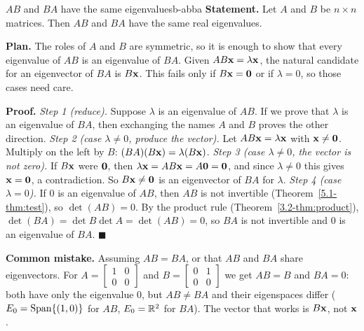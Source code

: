 \documentclass[11pt]{article}
\begin{document}
\begin{exmp}{$AB$ and $BA$ have the same eigenvalues}{b-abba}
\textbf{Statement.} Let $A$ and $B$ be $n\times n$ matrices. Then $AB$ and $BA$ have the same real eigenvalues.

\textbf{Plan.} The roles of $A$ and $B$ are symmetric, so it is enough to show that every eigenvalue of $AB$ is an eigenvalue of $BA$. Given $AB\mathbf{x}=\lambda\mathbf{x}$, the natural candidate for an eigenvector of $BA$ is $B\mathbf{x}$. This fails only if $B\mathbf{x}=\mathbf{0}$ or if $\lambda=0$, so those cases need care.

\textbf{Proof.}
\emph{Step 1 (reduce).} Suppose $\lambda$ is an eigenvalue of $AB$. If we prove that $\lambda$ is an eigenvalue of $BA$, then exchanging the names $A$ and $B$ proves the other direction.
\emph{Step 2 (case $\lambda\neq0$, produce the vector).} Let $AB\mathbf{x}=\lambda\mathbf{x}$ with $\mathbf{x}\neq\mathbf{0}$. Multiply on the left by $B$: $(BA)(B\mathbf{x})=\lambda(B\mathbf{x})$.
\emph{Step 3 (case $\lambda\neq0$, the vector is not zero).} If $B\mathbf{x}$ were $\mathbf{0}$, then $\lambda\mathbf{x}=AB\mathbf{x}=A\mathbf{0}=\mathbf{0}$, and since $\lambda\neq0$ this gives $\mathbf{x}=\mathbf{0}$, a contradiction. So $B\mathbf{x}\neq\mathbf{0}$ is an eigenvector of $BA$ for $\lambda$.
\emph{Step 4 (case $\lambda=0$).} If $0$ is an eigenvalue of $AB$, then $AB$ is not invertible (Theorem~\ref{5.1-thm:test}), so $\det(AB)=0$. By the product rule (Theorem~\ref{3.2-thm:product}), $\det(BA)=\det B\det A=\det(AB)=0$, so $BA$ is not invertible and $0$ is an eigenvalue of $BA$. \qquad$\blacksquare$

\textbf{Common mistake.} Assuming $AB=BA$, or that $AB$ and $BA$ share eigenvectors. For $A=\begin{bmatrix}1&0\\0&0\end{bmatrix}$ and $B=\begin{bmatrix}0&1\\0&0\end{bmatrix}$ we get $AB=B$ and $BA=0$: both have only the eigenvalue $0$, but $AB\neq BA$ and their eigenspaces differ ($E_0=\operatorname{Span}\{(1,0)\}$ for $AB$, $E_0=\mathbb{R}^2$ for $BA$). The vector that works is $B\mathbf{x}$, not $\mathbf{x}$.
\end{exmp}
\end{document}
